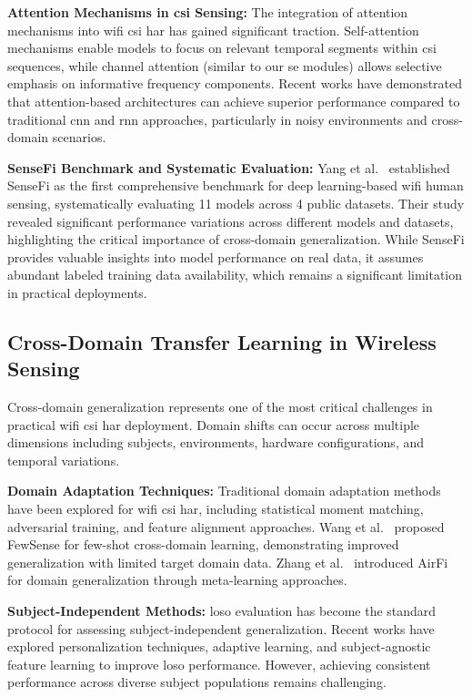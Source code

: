 \documentclass[journal]{IEEEtran}
\begin{document}
\textbf{Attention Mechanisms in \gls{csi} Sensing:} The integration of attention mechanisms into \gls{wifi} \gls{csi} \gls{har} has gained significant traction. Self-attention mechanisms enable models to focus on relevant temporal segments within \gls{csi} sequences, while channel attention (similar to our \gls{se} modules) allows selective emphasis on informative frequency components. Recent works have demonstrated that attention-based architectures can achieve superior performance compared to traditional \gls{cnn} and \gls{rnn} approaches, particularly in noisy environments and cross-domain scenarios.

\textbf{SenseFi Benchmark and Systematic Evaluation:} Yang et al.~\cite{yang2023sensefi} established SenseFi as the first comprehensive benchmark for deep learning-based \gls{wifi} human sensing, systematically evaluating 11 models across 4 public datasets. Their study revealed significant performance variations across different models and datasets, highlighting the critical importance of cross-domain generalization. While SenseFi provides valuable insights into model performance on real data, it assumes abundant labeled training data availability, which remains a significant limitation in practical deployments.

\subsection{Cross-Domain Transfer Learning in Wireless Sensing}

Cross-domain generalization represents one of the most critical challenges in practical \gls{wifi} \gls{csi} \gls{har} deployment. Domain shifts can occur across multiple dimensions including subjects, environments, hardware configurations, and temporal variations.

\textbf{Domain Adaptation Techniques:} Traditional domain adaptation methods have been explored for \gls{wifi} \gls{csi} \gls{har}, including statistical moment matching, adversarial training, and feature alignment approaches. Wang et al.~\cite{fewsense2022} proposed FewSense for few-shot cross-domain learning, demonstrating improved generalization with limited target domain data. Zhang et al.~\cite{airfi2022} introduced AirFi for domain generalization through meta-learning approaches.

\textbf{Subject-Independent Methods:} \gls{loso} evaluation has become the standard protocol for assessing subject-independent generalization. Recent works have explored personalization techniques, adaptive learning, and subject-agnostic feature learning to improve \gls{loso} performance. However, achieving consistent performance across diverse subject populations remains challenging.
\end{document}
